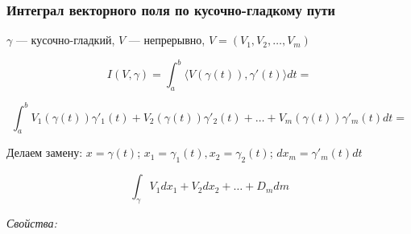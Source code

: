 \documentclass{article}
\begin{document}
\subsubsection{Интеграл векторного поля по кусочно-гладкому пути}

$\gamma$ --- кусочно-гладкий, $V$ --- непрерывно, $V = (V_1, V_2, \ldots, V_m)$

\[I(V, \gamma) = \int_a^b\langle V\left(\gamma(t)\right), \gamma'(t)\rangle dt = \]

\[\int_a^b V_1\left(\gamma(t)\right)\gamma'_1(t) + V_2\left(\gamma(t)\right)\gamma'_2(t) + \ldots + V_m\left(\gamma(t)\right)\gamma'_m(t) dt =\]

Делаем замену: $x = \gamma(t)$; $x_1 = \gamma_1(t), x_2 = \gamma_2(t)$; $dx_m = \gamma'_m(t) dt$

\[\int_{\gamma} V_1 dx_1 + V_2 dx_2 + \ldots + D_m dm\]

\textit{Свойства:}
\end{document}
